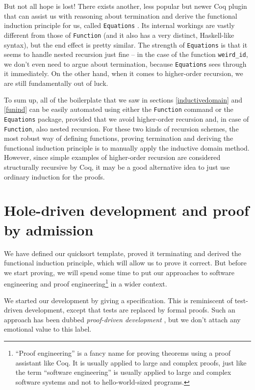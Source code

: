 \documentclass[declaration,mgr,english,shortabstract]{iithesis}
\newcommand{\m}[1]{\texttt{#1}}
\begin{document}
But not all hope is lost! There exists another, less popular but newer Coq plugin that can assist us with reasoning about termination and derive the functional induction principle for us, called \m{Equations} \cite{Equations}. Its internal workings are vastly different from those of \m{Function} (and it also has a very distinct, Haskell-like syntax), but the end effect is pretty similar. The strength of \m{Equations} is that it seems to handle nested recursion just fine -- in the case of the function \m{weird\_id}, we don't even need to argue about termination, because \m{Equations} sees through it immediately. On the other hand, when it comes to higher-order recursion, we are still fundamentally out of luck.

To sum up, all of the boilerplate that we saw in sections \ref{inductivedomain} and \ref{funind} can be easily automated using either the \m{Function} command or the \m{Equations} package, provided that we avoid higher-order recursion and, in case of \m{Function}, also nested recursion. For these two kinds of recursion schemes, the most robust way of defining functions, proving termination and deriving the functional induction principle is to manually apply the inductive domain method. However, since simple examples of higher-order recursion are considered structurally recursive by Coq, it may be a good alternative idea to just use ordinary induction for the proofs.

\section{Hole-driven development and proof by admission} \label{byadmission}

We have defined our quicksort template, proved it terminating and derived the functional induction principle, which will allow us to prove it correct. But before we start proving, we will spend some time to put our approaches to software engineering and proof engineering\footnote{``Proof engineering'' is a fancy name for proving theorems using a proof assistant like Coq. It is usually applied to large and complex proofs, just like the term ``software engineering'' is usually applied to large and complex software systems and not to hello-world-sized programs.} in a wider context.

We started our development by giving a specification. This is reminiscent of test-driven development, except that tests are replaced by formal proofs. Such an approach has been dubbed \textit{proof-driven development} \cite{ProofDriven}, but we don't attach any emotional value to this label.
\end{document}
